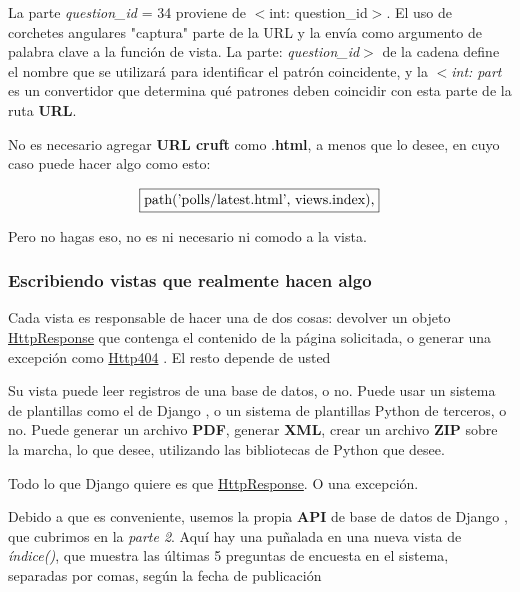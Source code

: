 \documentclass[10pt]{article}
\newcommand{\py}[1]{{\textcolor{B}{Python} #1}}
\newcommand{\django}[1]{{\textcolor{G}{Django} #1}}
\begin{document}
\begin{center}
\end{center}

La parte \textit{question\_id} = 34 proviene de $<$int: question\_id$>$. El uso de corchetes angulares "captura" parte de la URL y la envía como argumento de palabra clave a la función de vista. La parte: \textit{question\_id}$>$ de la cadena define el nombre que se utilizará para identificar el patrón coincidente, y la \textit{$<$int: part} es un convertidor que determina qué patrones deben coincidir con esta parte de la ruta \textbf{URL}.

No es necesario agregar \textbf{URL cruft} como .\textbf{html}, a menos que lo desee, en cuyo caso puede hacer algo como esto:

$$\fbox{path('polls/latest.html', views.index),}$$

Pero no hagas eso, no es ni necesario ni comodo a la vista.

\subsubsection{Escribiendo vistas que realmente hacen algo}
Cada vista es responsable de hacer una de dos cosas: devolver un objeto {\href{https://docs.djangoproject.com/en/3.0/ref/request-response/\#django.http.HttpResponse}{\textcolor{B}{HttpResponse}}}
 que contenga el contenido de la página solicitada, o generar una excepción como {\href{https://docs.djangoproject.com/en/3.0/topics/http/views/\#django.http.Http404}{\textcolor{B}{Http404}}}
. El resto depende de usted


Su vista puede leer registros de una base de datos, o no. Puede usar un sistema de plantillas como el de \django{}, o un sistema de plantillas \py{} de terceros, o no. Puede generar un archivo \textbf{PDF}, generar \textbf{XML}, crear un archivo \textbf{ZIP} sobre la marcha, lo que desee, utilizando las bibliotecas de \py{} que desee.

Todo lo que \django{} quiere es que {\href{https://docs.djangoproject.com/en/3.0/ref/request-response/\#django.http.HttpResponse}{\textcolor{B}{HttpResponse}}}. O una excepción.

Debido a que es conveniente, usemos la propia \textbf{API} de base de datos de \django{}, que cubrimos en la \textit{parte 2}. Aquí hay una puñalada en una nueva vista de \textit{índice()}, que muestra las últimas 5 preguntas de encuesta en el sistema, separadas por comas, según la fecha de publicación
\end{document}
